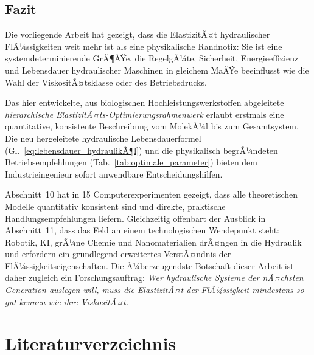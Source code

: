 ﻿\documentclass[a4paper,12pt]{scrreprt}
\theoremstyle{definition}
\begin{document}
\subsection*{Fazit}

Die vorliegende Arbeit hat gezeigt, dass die ElastizitÃ¤t hydraulischer
FlÃ¼ssigkeiten weit mehr ist als eine physikalische Randnotiz: Sie ist
eine systemdeterminierende GrÃ¶ÃŸe, die RegelgÃ¼te, Sicherheit, Energie\-effizienz
und Lebensdauer hydraulischer Maschinen in gleichem MaÃŸe beeinflusst
wie die Wahl der ViskositÃ¤tsklasse oder des Betriebsdrucks.

Das hier entwickelte, aus biologischen Hochleistungswerkstoffen abgeleitete
\emph{hierarchische ElastizitÃ¤ts-Optimierungsrahmenwerk} erlaubt erstmals
eine quantitative, konsistente Beschreibung vom MolekÃ¼l bis zum Gesamtsystem.
Die neu hergeleitete hydraulische Lebensdauerformel
(Gl.~\eqref{eq:lebensdauer_hydraulikÃ¶l}) und die physikalisch begrÃ¼ndeten
Betriebsempfehlungen (Tab.~\ref{tab:optimale_parameter}) bieten dem
Industrieingenieur sofort anwendbare Entscheidungshilfen.

Abschnitt~10 hat in 15 Computerexperimenten gezeigt, dass alle
theoretischen Modelle quantitativ konsistent sind und direkte,
praktische Handlungsempfehlungen liefern. Gleichzeitig offenbart
der Ausblick in Abschnitt~11, dass das Feld an einem technologischen
Wendepunkt steht: Robotik, KI, grÃ¼ne Chemie und Nano\-materialien
drÃ¤ngen in die Hydraulik und erfordern ein grundlegend erweitertes
VerstÃ¤ndnis der FlÃ¼ssigkeitseigenschaften.
Die Ã¼berzeugendste Botschaft dieser Arbeit ist daher zugleich
ein Forschungsauftrag: \emph{Wer hydraulische Systeme der nÃ¤chsten
Generation auslegen will, muss die ElastizitÃ¤t der FlÃ¼ssigkeit
mindestens so gut kennen wie ihre ViskositÃ¤t.}

\clearpage
\section*{Literaturverzeichnis}
\end{document}
